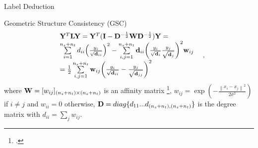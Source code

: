 \documentclass{beamer}
\begin{document}
\begin{frame}{Label Deduction}
\begin{block}{Geometric Structure Consistency (GSC) }
\begin{equation}\label{eq:YLY}
		\begin{array}{c}
		\begin{array}{l}
		\begin{array}{l}
		{{\bf{Y}}^T}{\bf{L}}{\bf{Y}} = {{\bf{Y}}^T}({\bf{I}} - {{\bf{D}}^{ - \frac{1}{2}}}{\bf{W}}{{\bf{D}}^{ - \frac{1}{2}}}){\bf{Y}} = \\
		\sum\limits_{i = 1}^{{n_s} + {n_t}} {{d_{ii}}{{\left( {\frac{{{y_i}}}{{\sqrt {{{\bf{d}}_{ii}}} }}} \right)}^2}}  - \sum\limits_{i,j = 1}^{{n_s} + {n_t}} {{{\bf{d}}_{ii}}{{\left( {\frac{{{y_i}}}{{\sqrt {{{\bf{d}}_i}} }}\frac{{{y_j}}}{{\sqrt {{{\bf{d}}_j}} }}} \right)}^2}} {{\bf{w}}_{ij}}\;\\
		= \frac{1}{2}\sum\limits_{i,j = 1}^{{n_s} + {n_t}} {{{\bf{w}}_{ij}}{{\left( {\frac{{{y_i}}}{{\sqrt {{{\bf{d}}_{ii}}} }} - \frac{{{y_j}}}{{\sqrt {{{\bf{d}}_{jj}}} }}} \right)}^2}} 
		\end{array}
		\end{array},
		\end{array}
		\end{equation}
  where  ${\bf{W}} = {[{w_{ij}}]_{({n_s} + {n_t}) \times ({n_s} + {n_t})}}$ is an affinity matrix \footcite{NIPS2001_2092},  ${w_{ij}} = \exp ( - \frac{{{{\left\| {{x_i} - {x_j}} \right\|}^2}}}{{2{\sigma ^2}}})$ if $i \ne j$ and ${w_{ii}} = 0$ otherwise, ${\bf{D}} = diag\{ {d_{11}}...{d_{({n_s} + {n_t}),({n_s} + {n_t})}}\} $ is the degree matrix with ${d_{ii}} = \sum\nolimits_j {{w_{ij}}} $. 
\end{block}
\end{frame}
\end{document}
